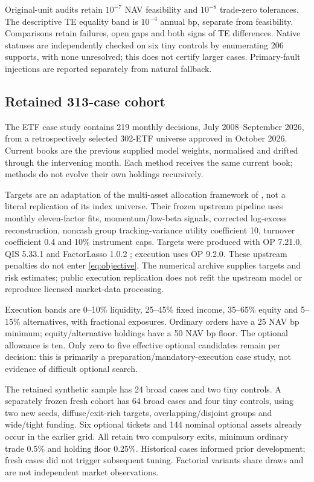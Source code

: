 \documentclass[preprint,12pt,authoryear]{elsarticle}
\begin{document}
Original-unit audits retain $10^{-7}$ NAV feasibility and $10^{-8}$ trade-zero
tolerances. The descriptive TE equality band is $10^{-4}$ annual bp, separate
from feasibility. Comparisons retain failures, open gaps and both signs of TE
differences. Native statuses are independently checked on six tiny controls
by enumerating 206 supports, with none unresolved; this does not certify larger
cases. Primary-fault injections are reported separately from natural fallback.

\subsection{Retained 313-case cohort}
The ETF case study contains 219 monthly decisions, July 2008--September 2026,
from a retrospectively selected 302-ETF universe approved in October 2026.
Current books are the previous supplied model weights, normalised and drifted
through the intervening month. Each method receives the same current book;
methods do not evolve their own holdings recursively.

Targets are an adaptation of the multi-asset allocation framework of
\citet{sepp2026}, not a literal replication of its index universe. Their frozen
upstream pipeline uses monthly eleven-factor fits, momentum/low-beta signals,
corrected log-excess reconstruction, noncash group tracking-variance utility
coefficient 10, turnover coefficient 0.4 and 10\% instrument caps. Targets were
produced with OP 7.21.0, QIS 5.33.1 and FactorLasso 1.0.2 \citep{factorlasso};
execution uses OP 9.2.0.
These upstream penalties do not enter \eqref{eq:objective}. The numerical archive
supplies targets and risk estimates; public execution replication does not refit
the upstream model or reproduce licensed market-data processing.

Execution bands are 0--10\% liquidity, 25--45\% fixed income, 35--65\% equity
and 5--15\% alternatives, with fractional exposures. Ordinary orders have a
25 NAV bp minimum; equity/alternative holdings have a 50 NAV bp floor. The
optional allowance is ten. Only zero to five effective optional candidates
remain per decision: this is primarily a preparation/mandatory-execution case
study, not evidence of difficult optional search.

The retained synthetic sample has 24 broad cases and two tiny controls. A
separately frozen fresh cohort has 64 broad cases and four tiny controls, using
two new seeds, diffuse/exit-rich targets, overlapping/disjoint groups and
wide/tight funding. Six optional tickets and 144 nominal optional assets
already occur in the earlier grid. All retain two compulsory exits, minimum
ordinary trade 0.5\% and holding floor 0.25\%. Historical cases informed prior
development; fresh cases did not trigger subsequent tuning. Factorial variants
share draws and are not independent market observations.
\end{document}
